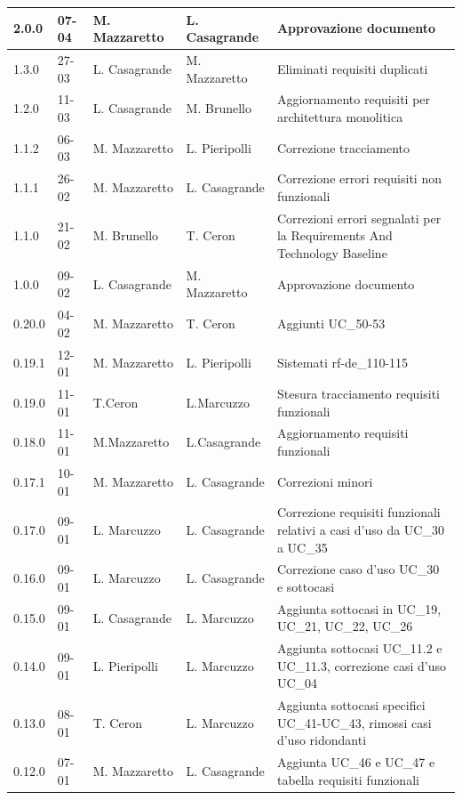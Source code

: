 \begin{longtable}{|p{}|p{}|p{}|p{}|p{}|}
	2.0.0 & 07-04 & M. Mazzaretto & L. Casagrande & Approvazione documento \\
	\hline
	1.3.0 & 27-03 & L. Casagrande & M. Mazzaretto & Eliminati requisiti duplicati \\
	\hline
    1.2.0 & 11-03 & L. Casagrande & M. Brunello & Aggiornamento requisiti per architettura monolitica \\
	\hline
    1.1.2 & 06-03 & M. Mazzaretto & L. Pieripolli & Correzione tracciamento \\
	\hline
	1.1.1 & 26-02 & M. Mazzaretto & L. Casagrande & Correzione errori requisiti non funzionali \\
	\hline
	1.1.0 & 21-02 & M. Brunello & T. Ceron & Correzioni errori segnalati per la Requirements And Technology Baseline \\
	\hline
    1.0.0 & 09-02 & L. Casagrande & M. Mazzaretto & Approvazione documento \\
	\hline
    0.20.0 & 04-02 & M. Mazzaretto & T. Ceron & Aggiunti UC\_50-53 \\
	\hline
	0.19.1 & 12-01 & M. Mazzaretto & L. Pieripolli & Sistemati rf-de\_110-115 \\
	\hline
    0.19.0 & 11-01 & T.Ceron & L.Marcuzzo & Stesura tracciamento requisiti funzionali\\
    \hline
    0.18.0 & 11-01 & M.Mazzaretto & L.Casagrande & Aggiornamento requisiti funzionali \\ 
    \hline
    0.17.1 & 10-01 & M. Mazzaretto & L. Casagrande & Correzioni minori \\
    \hline
    0.17.0 & 09-01 & L. Marcuzzo & L. Casagrande & Correzione requisiti funzionali relativi a casi d'uso da UC\_30 a UC\_35 \\
    \hline
    0.16.0 & 09-01 & L. Marcuzzo & L. Casagrande & Correzione caso d'uso UC\_30 e sottocasi \\
    \hline
    0.15.0 & 09-01 & L. Casagrande & L. Marcuzzo & Aggiunta sottocasi in UC\_19, UC\_21, UC\_22, UC\_26 \\
    \hline
    0.14.0 & 09-01 & L. Pieripolli & L. Marcuzzo & Aggiunta sottocasi UC\_11.2 e UC\_11.3, correzione casi d'uso UC\_04 \\
    \hline
    0.13.0 & 08-01 & T. Ceron & L. Marcuzzo & Aggiunta sottocasi specifici UC\_41-UC\_43, rimossi casi d'uso ridondanti \\
    \hline
    0.12.0 & 07-01 & M. Mazzaretto & L. Casagrande & Aggiunta UC\_46 e UC\_47 e tabella requisiti funzionali \\
    \hline

\end{longtable}
